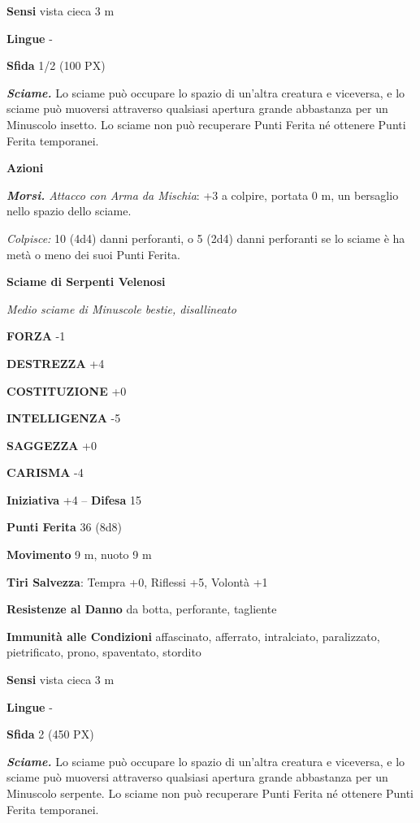 \begin{multicols}{2}
\textbf{Sensi} vista cieca 3 m

\textbf{Lingue} -

\textbf{Sfida} 1/2 (100 PX)

\textit{\textbf{Sciame.}} Lo sciame può occupare lo spazio di un'altra creatura e viceversa, e lo sciame può muoversi attraverso qualsiasi apertura grande abbastanza per un Minuscolo insetto. Lo sciame non può recuperare Punti Ferita né ottenere Punti Ferita temporanei.

\textbf{Azioni}

\textit{\textbf{Morsi.} Attacco con Arma da Mischia}: +3 a colpire, portata 0 m, un bersaglio nello spazio dello sciame.

\textit{Colpisce:} 10 (4d4) danni perforanti, o 5 (2d4) danni perforanti se lo sciame è ha metà o meno dei suoi Punti Ferita.

\medskip\textbf{Sciame di Serpenti Velenosi}

\textit{Medio sciame di Minuscole bestie, disallineato}

\textbf{FORZA} -1

\textbf{DESTREZZA} +4

\textbf{COSTITUZIONE} +0

\textbf{INTELLIGENZA} -5

\textbf{SAGGEZZA} +0

\textbf{CARISMA} -4

\textbf{Iniziativa} +4 -- \textbf{Difesa} 15

\textbf{Punti Ferita} 36 (8d8)

\textbf{Movimento} 9 m, nuoto 9 m

\textbf{Tiri Salvezza}: Tempra +0, Riflessi +5, Volontà +1

\textbf{Resistenze al Danno} da botta, perforante, tagliente

\textbf{Immunità alle Condizioni} affascinato, afferrato, intralciato, paralizzato, pietrificato, prono, spaventato, stordito

\textbf{Sensi} vista cieca 3 m

\textbf{Lingue} -

\textbf{Sfida} 2 (450 PX)

\textit{\textbf{Sciame.}} Lo sciame può occupare lo spazio di un'altra creatura e viceversa, e lo sciame può muoversi attraverso qualsiasi apertura grande abbastanza per un Minuscolo serpente. Lo sciame non può recuperare Punti Ferita né ottenere Punti Ferita temporanei.


\end{multicols}
